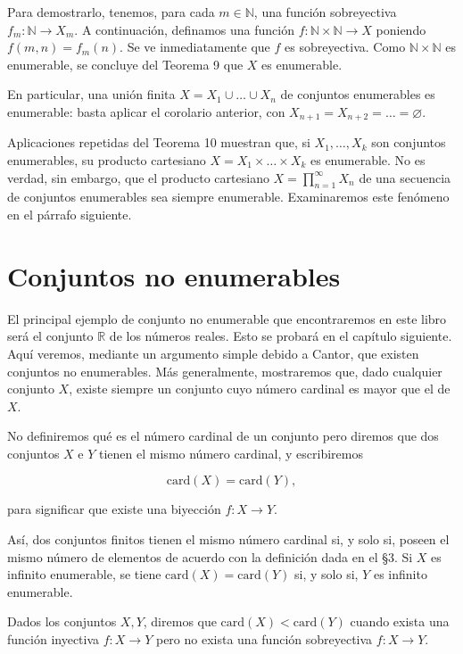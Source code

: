 Para demostrarlo, tenemos, para cada \( m \in \mathbb{N} \), una función sobreyectiva \( f_m: \mathbb{N} \to X_m \). A continuación, definamos una función \( f: \mathbb{N} \times \mathbb{N} \to X \) poniendo \( f(m, n) = f_m(n) \). Se ve inmediatamente que \( f \) es sobreyectiva. Como \( \mathbb{N} \times \mathbb{N} \) es enumerable, se concluye del Teorema 9 que \( X \) es enumerable.

En particular, una unión finita \( X = X_1 \cup \dots \cup X_n \) de conjuntos enumerables es enumerable: basta aplicar el corolario anterior, con \( X_{n+1} = X_{n+2} = \dots = \varnothing \).

Aplicaciones repetidas del Teorema 10 muestran que, si \( X_1, \dots, X_k \) son conjuntos enumerables, su producto cartesiano \( X = X_1 \times \dots \times X_k \) es enumerable. No es verdad, sin embargo, que el producto cartesiano \( X = \prod_{n=1}^{\infty} X_n \) de una secuencia de conjuntos enumerables sea siempre enumerable. Examinaremos este fenómeno en el párrafo siguiente.

\section{Conjuntos no enumerables}

El principal ejemplo de conjunto no enumerable que encontraremos en este libro será el conjunto \( \mathbb{R} \) de los números reales. Esto se probará en el capítulo siguiente. Aquí veremos, mediante un argumento simple debido a Cantor, que existen conjuntos no enumerables. Más generalmente, mostraremos que, dado cualquier conjunto \( X \), existe siempre un conjunto cuyo número cardinal es mayor que el de \( X \).

No definiremos qué es el número cardinal de un conjunto pero diremos que dos conjuntos \( X \) e \( Y \) tienen el mismo número cardinal, y escribiremos

\[ \text{card}(X) = \text{card}(Y), \]

para significar que existe una biyección \( f: X \to Y \).

Así, dos conjuntos finitos tienen el mismo número cardinal si, y solo si, poseen el mismo número de elementos de acuerdo con la definición dada en el §3. Si \( X \) es infinito enumerable, se tiene \( \text{card}(X) = \text{card}(Y) \) si, y solo si, \( Y \) es infinito enumerable.

Dados los conjuntos \( X, Y \), diremos que \( \text{card}(X) < \text{card}(Y) \) cuando exista una función inyectiva \( f: X \to Y \) pero no exista una función sobreyectiva \( f: X \to Y \).

